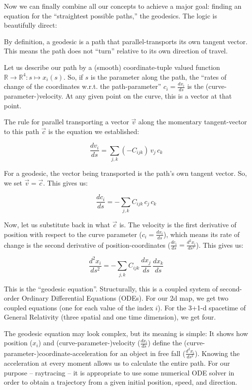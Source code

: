 \documentclass[twocolumn]{article}
\begin{document}
Now we can finally combine all our concepts to achieve a major goal:
finding an equation for the ``straightest possible paths,'' the
geodesics. The logic is beautifully direct:

By definition, a geodesic is a path that parallel-transports its own
tangent vector. This means the path does not ``turn'' relative to its
own direction of travel.

Let us describe our path by a (smooth) coordinate-tuple valued function
$\mathbb{R}\to\mathbb{R}^4: s\mapsto x_i(s)$.
So, if \(s\) is the parameter along the path, the ``rates of change of the coordinates
w.r.t. the path-parameter'' \(c_i = \frac{d x_i}{ds}\) is the
(curve-parameter-)velocity. At any given point on the curve, this
is a vector at that point.

The rule for parallel transporting a vector \(\vec{v}\) along the
momentary tangent-vector to this path
\(\vec{c}\) is the equation we established:

\begin{equation}
\frac{d v_i}{ds} = \sum_{j,k} \left(-C_{ijk}\right) \, v_j \, c_k
\end{equation}

For a geodesic, the vector being transported is the path's own tangent
vector. So, we set \(\vec{v} = \vec{c}\). This gives us:

\begin{equation}
\frac{d c_i}{ds} = -\sum_{j,k} C_{ijk} \, c_j \, c_k
\end{equation}

Now, let us substitute back in what \(\vec{c}\) is. The velocity is
the first derivative of position with respect to the curve parameter
(\(c_i = \frac{d x_i}{ds}\)), which means its rate of change
is the second derivative of position-coordinates
(\(\frac{d c_i}{ds} = \frac{d^2 x_i}{ds^2}\)). This gives us:

\begin{equation}
\frac{d^2 x_i}{ds^2} = -\sum_{j,k} C_{ijk} \, \frac{d x_j}{ds} \, \frac{d x_k}{ds}
\end{equation}

This is the ``geodesic equation''. Structurally, this is a coupled
system of second-order Ordinary Differential Equations (ODEs). For
our 2d map, we get two coupled equations (one for each value
of the index \(i\)). For the 3+1-d spacetime of General Relativity
(three spatial and one time dimension), we get four.

The geodesic equation may look complex, but its meaning is simple: It
shows how position (\(x_i\)) and (curve-parameter-)velocity (\(\frac{d
x_i}{ds}\)) define the (curve-parameter-)coordinate-acceleration for
an object in free fall (\(\frac{d^2 x_i}{ds^2}\)). Knowing the
acceleration at every moment allows us to calculate the entire
path. For our purpose -- raytracing -- it is appropriate to use some
numerical ODE solver in order to obtain a trajectory from a given
initial position, speed, and direction.
\end{document}
